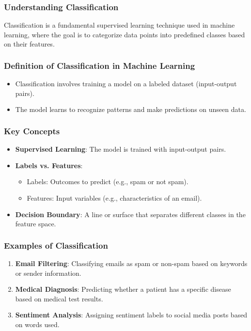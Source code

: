 \documentclass[aspectratio=169]{beamer}
\begin{document}
\begin{frame}[fragile]
    \frametitle{Understanding Classification}
    Classification is a fundamental supervised learning technique used in machine learning, where the goal is to categorize data points into predefined classes based on their features.
\end{frame}

\begin{frame}[fragile]
    \frametitle{Definition of Classification in Machine Learning}
    \begin{itemize}
        \item Classification involves training a model on a labeled dataset (input-output pairs).
        \item The model learns to recognize patterns and make predictions on unseen data.
    \end{itemize}
\end{frame}

\begin{frame}[fragile]
    \frametitle{Key Concepts}
    \begin{itemize}
        \item \textbf{Supervised Learning}: The model is trained with input-output pairs.
        \item \textbf{Labels vs. Features}:
        \begin{itemize}
            \item Labels: Outcomes to predict (e.g., spam or not spam).
            \item Features: Input variables (e.g., characteristics of an email).
        \end{itemize}
        \item \textbf{Decision Boundary}: A line or surface that separates different classes in the feature space.
    \end{itemize}
\end{frame}

\begin{frame}[fragile]
    \frametitle{Examples of Classification}
    \begin{enumerate}
        \item \textbf{Email Filtering}: Classifying emails as spam or non-spam based on keywords or sender information.
        \item \textbf{Medical Diagnosis}: Predicting whether a patient has a specific disease based on medical test results.
        \item \textbf{Sentiment Analysis}: Assigning sentiment labels to social media posts based on words used.
    \end{enumerate}
\end{frame}
\end{document}
